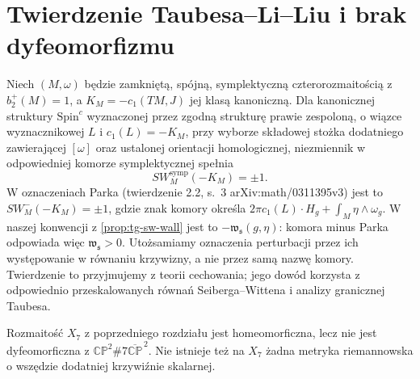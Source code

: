 \section{Twierdzenie Taubesa--Li--Liu i brak dyfeomorfizmu}
\label{sec:tg-park14-exotic}

\begin{twierdzenie}
\label{thm:tg-park14-taubes}
Niech $(M,\omega)$ będzie zamkniętą, spójną,
symplektyczną czterorozmaitością z $b_2^+(M)=1$,
a $K_M=-c_1(TM,J)$ jej klasą kanoniczną.
Dla kanonicznej struktury $\mathrm{Spin}^c$
wyznaczonej przez zgodną strukturę prawie zespoloną,
o wiązce wyznacznikowej $L$ i $c_1(L)=-K_M$,
przy wyborze składowej stożka dodatniego zawierającej
$[\omega]$ oraz ustalonej orientacji homologicznej, niezmiennik w odpowiedniej
komorze symplektycznej spełnia
\[
SW_M^{\mathrm{symp}}(-K_M)=\pm1.
\]
W oznaczeniach Parka (twierdzenie 2.2, s.~3
arXiv:math/0311395v3) jest to $SW_M^-(-K_M)=\pm1$,
gdzie znak komory określa
$2\pi c_1(L)\cdot H_g+\int_M\eta\wedge\omega_g$.
W naszej konwencji z \ref{prop:tg-sw-wall} jest to
$-\mathfrak w_{\mathfrak s}(g,\eta)$:
komora minus Parka odpowiada więc
$\mathfrak w_{\mathfrak s}>0$. Utożsamiamy
oznaczenia perturbacji przez ich występowanie
w równaniu krzywizny, a nie przez samą nazwę komory.
Twierdzenie to przyjmujemy z teorii cechowania;
jego dowód korzysta z odpowiednio przeskalowanych
równań Seiberga--Wittena i analizy granicznej Taubesa.
\end{twierdzenie}

\begin{twierdzenie}
\label{thm:tg-park14-exotic}
Rozmaitość $X_7$ z poprzedniego rozdziału jest
homeomorficzna, lecz nie jest dyfeomorficzna z
$\mathbb{CP}^{2}\#7\overline{\mathbb{CP}}^{\,2}$.
Nie istnieje też na $X_7$ żadna metryka riemannowska
o wszędzie dodatniej krzywiźnie skalarnej.
\end{twierdzenie}

